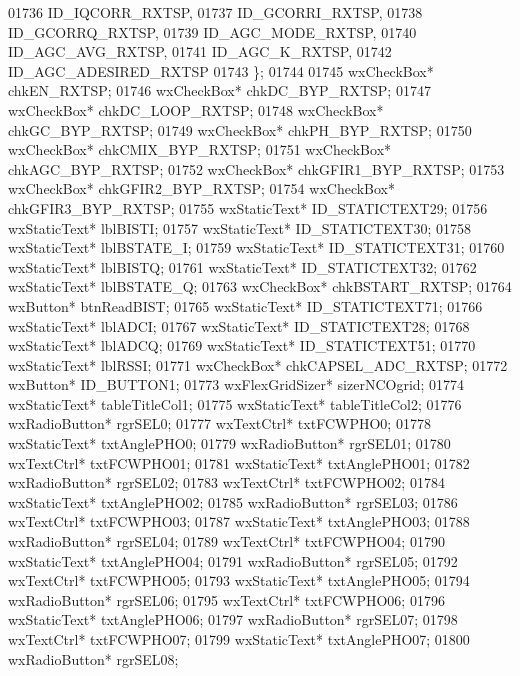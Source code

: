 \begin{DoxyCode}
01736             ID_IQCORR_RXTSP,
01737             ID_GCORRI_RXTSP,
01738             ID_GCORRQ_RXTSP,
01739             ID_AGC_MODE_RXTSP,
01740             ID_AGC_AVG_RXTSP,
01741             ID_AGC_K_RXTSP,
01742             ID\_AGC\_ADESIRED\_RXTSP
01743         \};
01744         
01745         wxCheckBox* chkEN_RXTSP;
01746         wxCheckBox* chkDC_BYP_RXTSP;
01747         wxCheckBox* chkDC_LOOP_RXTSP;
01748         wxCheckBox* chkGC_BYP_RXTSP;
01749         wxCheckBox* chkPH_BYP_RXTSP;
01750         wxCheckBox* chkCMIX_BYP_RXTSP;
01751         wxCheckBox* chkAGC_BYP_RXTSP;
01752         wxCheckBox* chkGFIR1_BYP_RXTSP;
01753         wxCheckBox* chkGFIR2_BYP_RXTSP;
01754         wxCheckBox* chkGFIR3_BYP_RXTSP;
01755         wxStaticText* ID_STATICTEXT29;
01756         wxStaticText* lblBISTI;
01757         wxStaticText* ID_STATICTEXT30;
01758         wxStaticText* lblBSTATE_I;
01759         wxStaticText* ID_STATICTEXT31;
01760         wxStaticText* lblBISTQ;
01761         wxStaticText* ID_STATICTEXT32;
01762         wxStaticText* lblBSTATE_Q;
01763         wxCheckBox* chkBSTART_RXTSP;
01764         wxButton* btnReadBIST;
01765         wxStaticText* ID_STATICTEXT71;
01766         wxStaticText* lblADCI;
01767         wxStaticText* ID_STATICTEXT28;
01768         wxStaticText* lblADCQ;
01769         wxStaticText* ID_STATICTEXT51;
01770         wxStaticText* lblRSSI;
01771         wxCheckBox* chkCAPSEL_ADC_RXTSP;
01772         wxButton* ID_BUTTON1;
01773         wxFlexGridSizer* sizerNCOgrid;
01774         wxStaticText* tableTitleCol1;
01775         wxStaticText* tableTitleCol2;
01776         wxRadioButton* rgrSEL0;
01777         wxTextCtrl* txtFCWPHO0;
01778         wxStaticText* txtAnglePHO0;
01779         wxRadioButton* rgrSEL01;
01780         wxTextCtrl* txtFCWPHO01;
01781         wxStaticText* txtAnglePHO01;
01782         wxRadioButton* rgrSEL02;
01783         wxTextCtrl* txtFCWPHO02;
01784         wxStaticText* txtAnglePHO02;
01785         wxRadioButton* rgrSEL03;
01786         wxTextCtrl* txtFCWPHO03;
01787         wxStaticText* txtAnglePHO03;
01788         wxRadioButton* rgrSEL04;
01789         wxTextCtrl* txtFCWPHO04;
01790         wxStaticText* txtAnglePHO04;
01791         wxRadioButton* rgrSEL05;
01792         wxTextCtrl* txtFCWPHO05;
01793         wxStaticText* txtAnglePHO05;
01794         wxRadioButton* rgrSEL06;
01795         wxTextCtrl* txtFCWPHO06;
01796         wxStaticText* txtAnglePHO06;
01797         wxRadioButton* rgrSEL07;
01798         wxTextCtrl* txtFCWPHO07;
01799         wxStaticText* txtAnglePHO07;
01800         wxRadioButton* rgrSEL08;

\end{DoxyCode}
